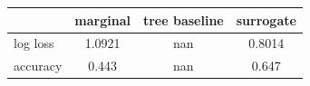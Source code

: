 \begin{tabular}{lccc}
\toprule
 & marginal & tree baseline & surrogate \\
\midrule
log loss & 1.0921 & nan & 0.8014 \\
accuracy & 0.443 & nan & 0.647 \\
\bottomrule
\end{tabular}
